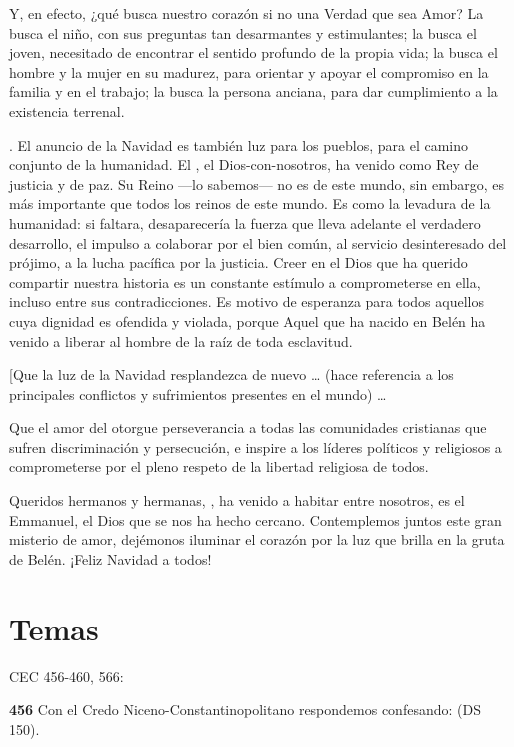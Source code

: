 \begin{body}
\begin{body}
Y, en efecto, ¿qué busca nuestro corazón si no una Verdad que sea Amor? La busca el niño, con sus preguntas tan desarmantes y estimulantes; la busca el joven, necesitado de encontrar el sentido profundo de la propia vida; la busca el hombre y la mujer en su madurez, para orientar y apoyar el compromiso en la familia y en el trabajo; la busca la persona anciana, para dar cumplimiento a la existencia terrenal.

. El anuncio de la Navidad es también luz para los pueblos, para el camino conjunto de la humanidad. El , el Dios-con-nosotros, ha venido como Rey de justicia y de paz. Su Reino ---lo sabemos--- no es de este mundo, sin embargo, es más importante que todos los reinos de este mundo. Es como la levadura de la humanidad: si faltara, desaparecería la fuerza que lleva adelante el verdadero desarrollo, el impulso a colaborar por el bien común, al servicio desinteresado del prójimo, a la lucha pacífica por la justicia. Creer en el Dios que ha querido compartir nuestra historia es un constante estímulo a comprometerse en ella, incluso entre sus contradicciones. Es motivo de esperanza para todos aquellos cuya dignidad es ofendida y violada, porque Aquel que ha nacido en Belén ha venido a liberar al hombre de la raíz de toda esclavitud.

{[}Que la luz de la Navidad resplandezca de nuevo \ldots{} (hace referencia a los principales conflictos y sufrimientos presentes en el mundo) \ldots{}

Que el amor del  otorgue perseverancia a todas las comunidades cristianas que sufren discriminación y persecución, e inspire a los líderes políticos y religiosos a comprometerse por el pleno respeto de la libertad religiosa de todos.

Queridos hermanos y hermanas, , ha venido a habitar entre nosotros, es el Emmanuel, el Dios que se nos ha hecho cercano. Contemplemos juntos este gran misterio de amor, dejémonos iluminar el corazón por la luz que brilla en la gruta de Belén. ¡Feliz Navidad a todos!


\section{Temas}


CEC 456-460, 566:

\textbf{456} Con el Credo Niceno-Constantinopolitano respondemos confesando:  (DS 150).


\end{body}
\end{body}
